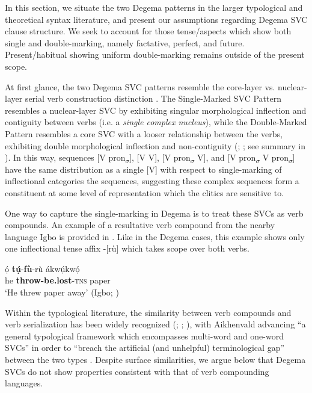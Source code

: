 \documentclass[output=paper]{langsci/langscibook}
\begin{document}
In this section, we situate the two Degema patterns in the larger typological and theoretical syntax literature, and present our assumptions regarding Degema SVC clause structure. We seek to account for those tense/aspects which show both single and double-marking, namely factative, perfect, and future. Present/ha\-bit\-u\-al showing uniform double-marking remains outside of the present scope. 

At first glance, the two Degema SVC patterns resemble the core-layer vs. nu\-cle\-ar-layer serial verb construction distinction \citep{FoleyOlson1985}. The Single-Marked SVC Pattern resembles a nuclear-layer SVC by exhibiting singular morphological inflection and contiguity between verbs (i.e. a \textit{single complex nucleus}), while the Double-Marked Pattern resembles a core SVC with a looser relationship between the verbs, exhibiting double morphological inflection and non-contiguity (\citealt[37--39]{FoleyOlson1985}; \citealt{Crowley2002}; see summary in \citealt[126-129]{ClearyKemp2015}). In this way, sequences [V pron\textsubscript{$\sigma $}], [V V], [V pron\textsubscript{$\sigma $} V], and [V pron\textsubscript{$\sigma $} V pron\textsubscript{$\sigma $}] have the same distribution as a single [V] with respect to single-marking of inflectional categories the sequences, suggesting these complex sequences form a constituent at some level of representation which the clitics are sensitive to. 

One way to capture the single-marking in Degema is to treat these SVCs as verb compounds. An example of a resultative verb compound from the nearby language Igbo is provided in . Like in the Degema cases, this example shows only one inflectional tense affix -[rù] which takes scope over both verbs.

\ea\label{ex:rolle:34}
\gll  ọ́    \textbf{{\downstep}tụ́}{}-\textbf{fù}{}-rù      ákwụ́kwọ́\\
     he  \textbf{throw-be.lost}{}-\textsc{tns}  paper\\
\glt ‘He threw paper away’ (Igbo; \citealt{Lord1975})
\z

Within the typological literature, the similarity between verb compounds and verb serialization has been widely recognized (\citealt[101]{Margetts1999}; \citealt[18]{Crowley2002}; \citealt[a.o.]{Aikhenvald2006}), with Aikhenvald advancing “a general typological framework which encompasses multi-word and one-word SVCs” in order to “breach the artificial (and unhelpful) terminological gap” between the two types \citep[38]{Aikhenvald2006}. Despite surface similarities, we argue below that Degema SVCs do not show properties consistent with that of verb compounding languages. 
\end{document}
